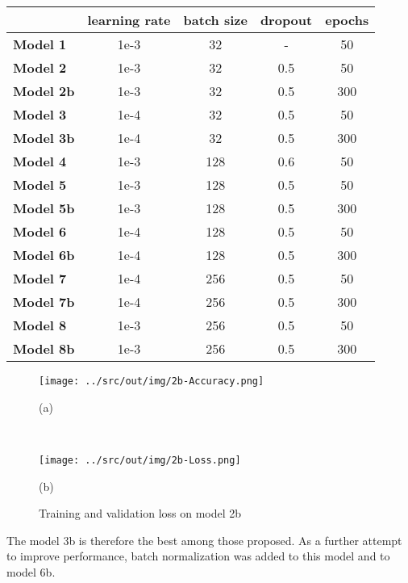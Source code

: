 \documentclass[a4paper,12pt]{article} %
\begin{document}
	\begin{table}[H]
		\centering
		\begin{tabular}{l@{\hspace{.5cm}}cccc}
			\toprule
			& \textbf{learning rate} & \textbf{batch size} & \textbf{dropout} & 
			\textbf{epochs} \\
			\midrule
			\textbf{Model 1}  & {1e-3} & {32}  &  -  & 50\\
			\textbf{Model 2}  & {1e-3} & {32}  & 0.5 & 50\\
			\textbf{Model 2b} & {1e-3} & {32}  & 0.5 & 300\\
			\textbf{Model 3}  & {1e-4} & {32}  & 0.5 & 50 \\
			\textbf{Model 3b} & {1e-4} & {32}  & 0.5 & 300 \\
			\textbf{Model 4}  & {1e-3} & {128} & 0.6 & 50 \\
			\textbf{Model 5}  & {1e-3} & {128} & 0.5 & 50 \\
			\textbf{Model 5b}  & {1e-3} & {128} & 0.5 & 300 \\
			\textbf{Model 6} & {1e-4} & {128} & 0.5 & 50 \\
			\textbf{Model 6b} & {1e-4} & {128} & 0.5 & 300 \\
			\textbf{Model 7}  & {1e-4} & {256} & 0.5 & 50 \\
			\textbf{Model 7b}  & {1e-4} & {256} & 0.5 & 300 \\
			\textbf{Model 8}  & {1e-3} & {256} & 0.5 & 50 \\
			\textbf{Model 8b}  & {1e-3} & {256} & 0.5 & 300 \\
			\bottomrule 
		\end{tabular}
		\label{tab:param}
	\end{table}

		
	\begin{figure}[H]
		\begin{minipage}[c]{.49\textwidth}
			\centering
			\texttt{[image: ../src/out/img/2b-Accuracy.png]}
			\caption*{(a)}
		\end{minipage}
		~
		\begin{minipage}[c]{.49\textwidth}
			\centering
			\texttt{[image: ../src/out/img/2b-Loss.png]}
			\caption*{(b)}
		\end{minipage}
		\caption{Training and validation loss on model 2b}
		\label{fig:model2b-performance}
	\end{figure}

	The model 3b is therefore the best among those proposed. As a further 
	attempt to improve performance, batch normalization was added to this model 
	and to model 6b.
	
\end{document}
